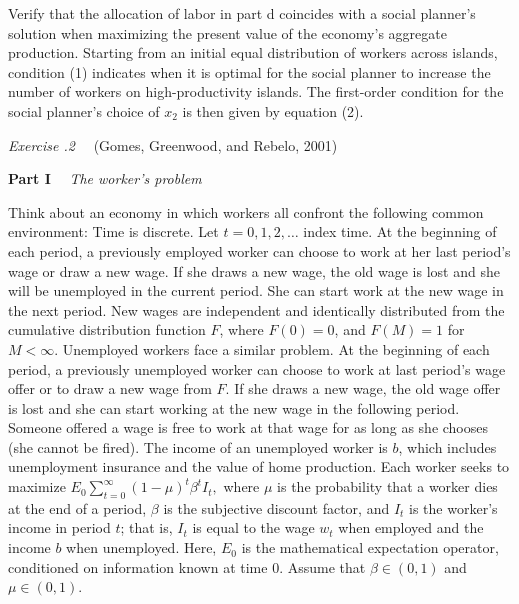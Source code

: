 \medskip
{}
Verify that the allocation of labor in part d coincides with a social
planner's solution when maximizing the present value of the
economy's aggregate production. Starting from an initial equal
distribution of workers across islands, condition (1)   %
indicates when it is optimal for the social planner to increase
the number of workers on high-productivity islands.
The first-order condition for the social planner's choice of
$x_2$ is then given by equation (2).           %

\medskip\noindent
{\it Exercise \the\chapternum.2} \ \ (Gomes, Greenwood,
and Rebelo, 2001)
%

\medskip\noindent
{\bf Part I} \ \ {\it The worker's problem}

\medskip\noindent
Think about an economy in which workers  all confront the following common
environment: Time is discrete.  Let $t=0, 1, 2, \ldots$ index time.
At the beginning of each period, a  previously employed
worker can choose to work at her last
period's wage or  draw a new wage.
 If she draws a new wage, the old wage is
lost and she will be unemployed in the current period.  She can start work
at the new wage in the next period.
New wages are independent and identically
distributed from the cumulative
distribution function $F$, where $F(0)=0$, and $F(M)=1$ for $M<\infty$. Unemployed workers face a similar problem. At the beginning of each period, a previously unemployed worker can choose to work at last period's wage offer or to draw a new wage from $F$. If she draws a new wage, the old wage offer is lost and she can start working at the new wage in the following period. Someone offered a wage is free to work at that wage for as long as she
chooses (she cannot be fired).  The income of an unemployed
worker is $b$, which includes unemployment insurance and the
value of home production.  Each worker seeks to maximize
$E_0 \sum_{t=0}^\infty (1-\mu)^t \beta^t I_t, $
where $\mu$ is the probability that a worker dies at the end of a period,
$\beta$ is the subjective discount factor, and $I_t$ is the worker's income
in period $t$; that is, $I_t$ is equal to the wage $w_t$ when employed
and the income $b$ when unemployed.  Here, $E_0$ is the mathematical
expectation operator, conditioned on information known at time $0$.
Assume that $\beta \in (0,1)$ and $\mu \in (0,1)$.

